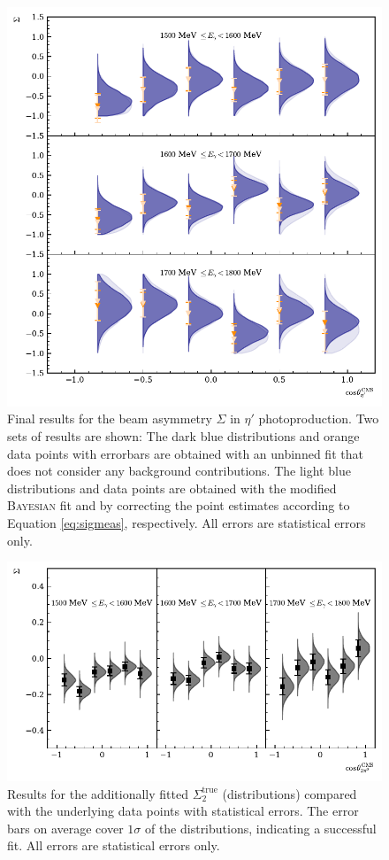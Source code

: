 \begin{figure}[htbp]
	\centering
	\includegraphics[width=\linewidth]{../bayes/etap_event_based_fit/plots/sigma_etap.pdf}
	\caption{Final results for the beam asymmetry $\Sigma$ in $\eta'$ photoproduction. Two sets of results are shown: The dark blue distributions and orange data points with errorbars are obtained with an unbinned fit that does not consider any background contributions. The light blue distributions and data points are obtained with the modified \textsc{Bayesian} fit and by correcting the point estimates according to Equation \eqref{eq:sigmeas}, respectively. All errors are statistical errors only.}
	\label{fig:sigmaetap}
\end{figure}
\begin{figure}[htbp]
	\centering
	\includegraphics[width=\linewidth]{../bayes/etap_event_based_fit/plots/sigma_2pi0.pdf}
	\caption{Results for the additionally fitted $\Sigma_2^\text{true}$ (distributions) compared with the underlying data points \cite{mahlbergphd} with statistical errors. The error bars on average cover $1\sigma$ of the distributions, indicating a successful fit. All errors are statistical errors only.}
	\label{fig:sigma2pi0}
\end{figure}
